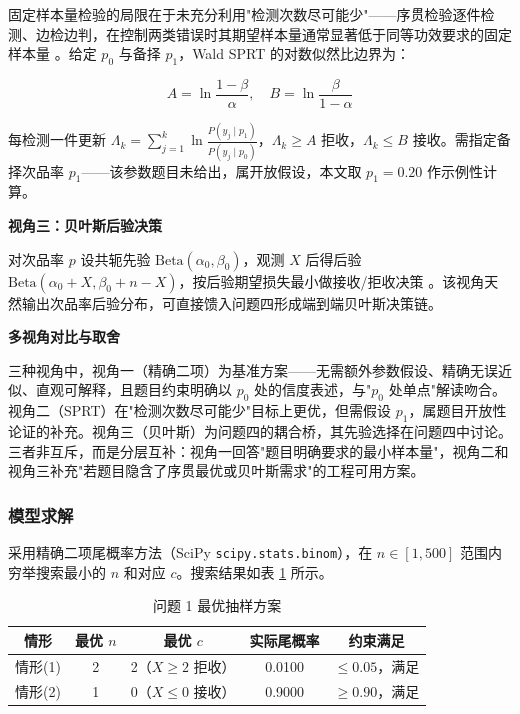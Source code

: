\documentclass[12pt,a4paper]{ctexart}
\begin{document}
固定样本量检验的局限在于未充分利用"检测次数尽可能少"——序贯检验逐件检测、边检边判，在控制两类错误时其期望样本量通常显著低于同等功效要求的固定样本量 \cite{ref1}。给定 $p_0$ 与备择 $p_1$，Wald SPRT 的对数似然比边界为：

\begin{equation}
A = \ln\frac{1-\beta}{\alpha},\quad B = \ln\frac{\beta}{1-\alpha}
\end{equation}

每检测一件更新 $\Lambda_k = \sum_{j=1}^{k} \ln\frac{P(y_j\mid p_1)}{P(y_j\mid p_0)}$，$\Lambda_k \ge A$ 拒收，$\Lambda_k \le B$ 接收。需指定备择次品率 $p_1$——该参数题目未给出，属开放假设，本文取 $p_1=0.20$ 作示例性计算。

\textbf{视角三：贝叶斯后验决策}

对次品率 $p$ 设共轭先验 $\text{Beta}(\alpha_0,\beta_0)$，观测 $X$ 后得后验 $\text{Beta}(\alpha_0+X,\beta_0+n-X)$，按后验期望损失最小做接收/拒收决策 \cite{ref3}。该视角天然输出次品率后验分布，可直接馈入问题四形成端到端贝叶斯决策链。

\textbf{多视角对比与取舍}

三种视角中，视角一（精确二项）为基准方案——无需额外参数假设、精确无误近似、直观可解释，且题目约束明确以 $p_0$ 处的信度表述，与"$p_0$ 处单点"解读吻合。视角二（SPRT）在"检测次数尽可能少"目标上更优，但需假设 $p_1$，属题目开放性论证的补充。视角三（贝叶斯）为问题四的耦合桥，其先验选择在问题四中讨论。三者非互斥，而是分层互补：视角一回答"题目明确要求的最小样本量"，视角二和视角三补充"若题目隐含了序贯最优或贝叶斯需求"的工程可用方案。

\subsubsection{模型求解}

采用精确二项尾概率方法（SciPy \texttt{scipy.stats.binom}），在 $n\in[1,500]$ 范围内穷举搜索最小的 $n$ 和对应 $c$。搜索结果如表 \ref{tab:q1_results} 所示。

\begin{table}[H]
\centering
\caption{问题 1 最优抽样方案}
\label{tab:q1_results}
\begin{tabular}{ccccc}
\toprule
情形 & 最优 $n$ & 最优 $c$ & 实际尾概率 & 约束满足 \\
\midrule
情形(1) & 2 & 2（$X\ge 2$ 拒收） & 0.0100 & $\le 0.05$，满足 \\
情形(2) & 1 & 0（$X\le 0$ 接收） & 0.9000 & $\ge 0.90$，满足 \\
\bottomrule
\end{tabular}
\end{table}
\end{document}
